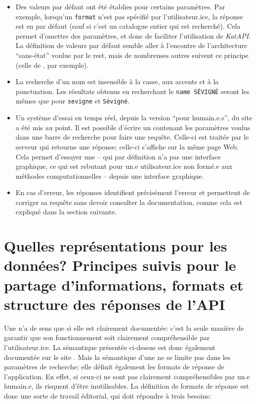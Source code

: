 \begin{itemize}
	\item Des valeurs par défaut ont été établies pour certains paramètres. Par exemple, lorsqu'un \texttt{format} n'est pas spécifié par l'utilisateur.ice, la réponse est en \json{} par défaut (sauf si c'est un catalogue entier qui est recherché). Cela permet d'omettre des paramètres, et donc de faciliter l'utilisation de \textit{KatAPI}. La définition de valeurs par défaut semble aller à l'encontre de l'architecture \enquote{sans-état} voulue par le \gls{rest}, mais de nombreuses autres \api{} suivent ce principe (celle de \wkd{}, par exemple).
	\item La recherche d'un nom est insensible à la casse, aux accents et à la ponctuation. Les résultats obtenus en recherchant le \texttt{name SÉVIGNÉ} seront les mêmes que pour \texttt{sevigne} et \texttt{Sévigné}.
	\item Un système d'essai en temps réel, depuis la version \enquote{pour humain.e.s}, du site a été mis au point. Il est possible d'écrire un \json{} contenant les paramètres voulus dans une barre de recherche pour faire une requête. Celle-ci est traitée par le serveur qui retourne une réponse; celle-ci s'affiche sur la même page Web. Cela permet d'essayer une \api{} -- qui par définition n'a pas une interface graphique, ce qui est rebutant pour un.e utilisateur.ice non formé.e aux méthodes computationnelles -- depuis une interface graphique.
	\item En cas d'erreur, les réponses identifient précisément l'erreur et permettent de corriger sa requête sans devoir consulter la documentation, comme cela est expliqué dans la section suivante.
\end{itemize}

\section{Quelles représentations pour les données? Principes suivis pour le partage d'informations, formats et structure des réponses de l'API}
Une \api{} n'a de sens que si elle est clairement documentée: c'est la seule manière de garantir que son fonctionnement soit clairement compréhensible par l'utilisateur.ice. La sémantique présentée ci-dessus est donc également documentée sur le site \ktb{}. Mais la sémantique d'une \api{} ne se limite pas dans les paramètres de recherche; elle définit également les formats de réponse de l'application. En effet, si ceux-ci ne sont pas clairement compréhensibles par un.e humain.e, ils risquent d'être inutilisables. La définition de formats de réponse est donc une sorte de travail éditorial, qui doit répondre à trois besoins:

